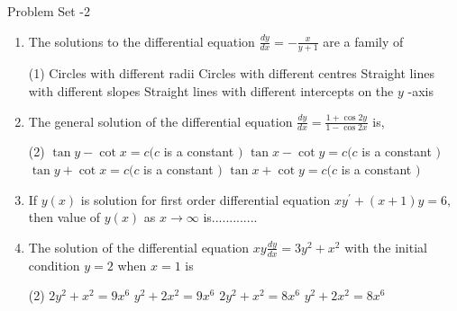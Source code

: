 \begin{abox}
	Problem Set -2
\end{abox}
\begin{enumerate}[label=\color{ocre}\textbf{\arabic*.}]
	\item The solutions to the differential equation $\frac{d y}{d x}=-\frac{x}{y+1}$ are a family of
	\begin{tasks}(1)
		\task[\textbf{a.}]Circles with different radii 
		\task[\textbf{b.}]Circles with different centres
		\task[\textbf{c.}]Straight lines with different slopes
		\task[\textbf{d.}]Straight lines with different intercepts on the $y$ -axis
	\end{tasks}
	\item  The general solution of the differential equation $\frac{d y}{d x}=\frac{1+\cos 2 y}{1-\cos 2 x}$ is,
	\begin{tasks}(2)
		\task[\textbf{a.}]$\tan y-\cot x=c(c$ is a constant $)$
		\task[\textbf{b.}]$\tan x-\cot y=c(c$ is a constant $)$
		\task[\textbf{c.}] $\tan y+\cot x=c(c$ is a constant $)$
		\task[\textbf{d.}] $\tan x+\cot y=c(c$ is a constant $)$
	\end{tasks}
	\item If $y(x)$ is solution for first order differential equation $x y^{\prime}+(x+1) y=6,$ then value of
	$y(x)$ as $x \rightarrow \infty$ is.............
	
	\item The solution of the differential equation $x y \frac{d y}{d x}=3 y^{2}+x^{2}$ with the initial condition $y=2$
	when $x=1$ is\begin{tasks}(2)
		\task[\textbf{a.}] $2 y^{2}+x^{2}=9 x^{6}$ 
		\task[\textbf{b.}]$y^{2}+2 x^{2}=9 x^{6}$
		\task[\textbf{c.}]$2 y^{2}+x^{2}=8 x^{6}$ 
		\task[\textbf{d.}]$y^{2}+2 x^{2}=8 x^{6}$ 
	\end{tasks}	
	

\end{enumerate}
